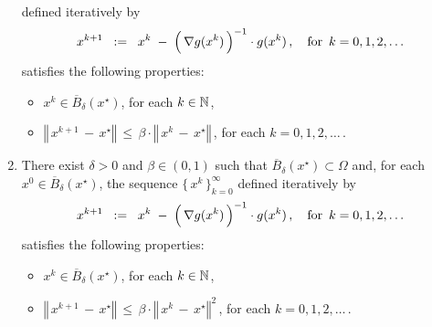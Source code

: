\begin{theorem}
\begin{enumerate}
	defined iteratively by
	\begin{equation*}
	x^{k+1}
	\;\; := \;\;
		x^{k} \;-\; \left(\,\overset{{\color{white}.}}{\nabla} g(x^{k})\,\right)^{-1}\cdot g(x^{k})\,,
	\quad
	\textnormal{for \,$k = 0, 1, 2, \ldots$}
	\end{equation*}
	satisfies the following properties:
	\begin{itemize}
	\item
		$x^{k} \in \overline{B}_{\delta}(x^{\star})$, for each $k \in \mathbb{N}$,
	\item
		$\left\Vert\,x^{k+1}\,-\,x^{\star}\right\Vert \, \leq \, \beta\cdot\left\Vert\,x^{k}\,-\,x^{\star}\right\Vert$\,,
		for each $k = 0,1,2,\ldots$\,.
	\end{itemize}
\item
	There exist $\delta > 0$ and $\beta \in (0,1)$
	such that $\overline{B}_{\delta}(x^{\star}) \subset \Omega$ and,
	for each $x^{0} \in \overline{B}_{\delta}(x^{\star})$, the sequence $\{\,x^{k}\,\}_{k=0}^{\infty}$
	defined iteratively by
	\begin{equation*}
	x^{k+1}
	\;\; := \;\;
		x^{k} \;-\; \left(\,\overset{{\color{white}.}}{\nabla} g(x^{k})\,\right)^{-1}\cdot g(x^{k})\,,
	\quad
	\textnormal{for \,$k = 0, 1, 2, \ldots$}
	\end{equation*}
	satisfies the following properties:
	\begin{itemize}
	\item
		$x^{k} \in \overline{B}_{\delta}(x^{\star})$, for each $k \in \mathbb{N}$,
	\item
		$\left\Vert\,x^{k+1}\,-\,x^{\star}\right\Vert \, \leq \, \beta \cdot \left\Vert\,x^{k}\,-\,x^{\star}\right\Vert^{2}$\,,
		for each $k = 0,1,2,\ldots$\,.
	\end{itemize}
\end{enumerate}
\end{theorem}
\proof
